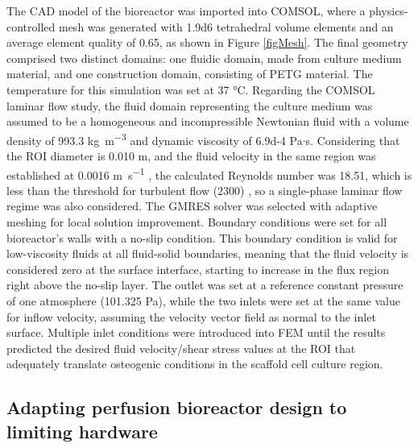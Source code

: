 The \ac{CAD} model of the bioreactor was imported into COMSOL, where a physics-controlled mesh was generated with \num{1.9d6} tetrahedral volume elements and an average element quality of 0.65, as shown in Figure \ref{figMesh}. The final geometry comprised two distinct domains: one fluidic domain, made from culture medium material, and one construction domain, consisting of \acs{PETG} material. The temperature for this simulation was set at 37 \si{\degreeCelsius}. Regarding the COMSOL laminar flow study, the fluid domain representing the culture medium was assumed to be a homogeneous and incompressible Newtonian fluid with a volume density of 993.3 \si{\kilo\gram\per\cubic\meter} and dynamic viscosity of \num{6.9d-4} \si{\pascal}$\cdot$\si{\second}. Considering that the \acs{ROI} diameter is 0.010 \si{\meter}, and the fluid velocity in the same region was established at 0.0016 \si{\meter\per\second} \cite{Zhao2018-ci}, the calculated Reynolds number was 18.51, which is less than the threshold for turbulent flow (2300) \cite{Chen2019-cl}, so a single-phase laminar flow regime was also considered. The \ac{GMRES} solver was selected with adaptive meshing for local solution improvement. Boundary conditions were set for all bioreactor's walls with a no-slip condition. This boundary condition is valid for low-viscosity fluids at all fluid-solid boundaries, meaning that the fluid velocity is considered zero at the surface interface, starting to increase in the flux region right above the no-slip layer. The outlet was set at a reference constant pressure of one atmosphere (101.325 \si{\pascal}), while the two inlets were set at the same value for inflow velocity, assuming the velocity vector field as normal to the inlet surface. Multiple inlet conditions were introduced into \ac{FEM} until the results predicted the desired fluid velocity/shear stress values at the \ac{ROI} that adequately translate osteogenic conditions in the scaffold cell culture region.


\subsection{Adapting perfusion bioreactor design to limiting hardware}

